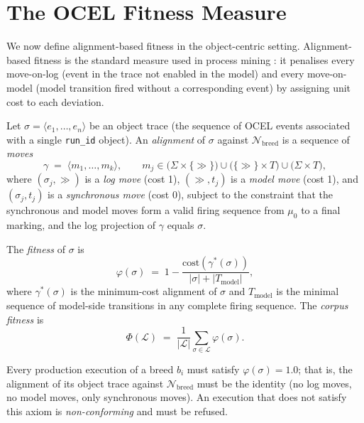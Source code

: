 \section{The OCEL Fitness Measure}
\label{sec:ocel-fitness}

We now define alignment-based fitness in the object-centric setting.
Alignment-based fitness is the standard measure used in process mining
\citep{adriansyah2014aligning}: it penalises every move-on-log (event in
the trace not enabled in the model) and every move-on-model (model
transition fired without a corresponding event) by assigning unit cost to
each deviation.

\begin{definition}
\label{def:ocel-fitness}
Let $\sigma = \langle e_1, \ldots, e_n \rangle$ be an object trace (the
sequence of OCEL events associated with a single \texttt{run\_id} object).
An \emph{alignment} of $\sigma$ against $\mathcal{N}_{\mathrm{breed}}$ is
a sequence of \emph{moves}
\[
  \gamma \;=\; \langle m_1, \ldots, m_k \rangle,
  \qquad
  m_j \in
    \bigl(\Sigma \times \{\gg\}\bigr)
    \cup
    \bigl(\{\gg\} \times T\bigr)
    \cup
    \bigl(\Sigma \times T\bigr),
\]
where $(\sigma_j, \gg)$ is a \emph{log move} (cost 1), $(\gg, t_j)$ is a
\emph{model move} (cost 1), and $(\sigma_j, t_j)$ is a \emph{synchronous
move} (cost 0), subject to the constraint that the synchronous and model
moves form a valid firing sequence from $\mu_0$ to a final marking, and the
log projection of $\gamma$ equals $\sigma$.

The \emph{fitness} of $\sigma$ is
\[
  \varphi(\sigma)
  \;=\;
  1 - \frac{\mathrm{cost}(\gamma^*(\sigma))}{|\sigma| + |T_{\mathrm{model}}|},
\]
where $\gamma^*(\sigma)$ is the minimum-cost alignment of $\sigma$ and
$T_{\mathrm{model}}$ is the minimal sequence of model-side transitions in
any complete firing sequence.  The \emph{corpus fitness} is
\[
  \Phi(\mathcal{L})
  \;=\;
  \frac{1}{|\mathcal{L}|} \sum_{\sigma \in \mathcal{L}} \varphi(\sigma).
\]
\end{definition}

\begin{axiom}
\label{ax:bvc-fitness}
Every production execution of a breed $b_i$ must satisfy
$\varphi(\sigma) = 1.0$; that is, the alignment of its object trace
against $\mathcal{N}_{\mathrm{breed}}$ must be the identity (no log moves,
no model moves, only synchronous moves).  An execution that does not satisfy
this axiom is \emph{non-conforming} and must be refused.
\end{axiom}

